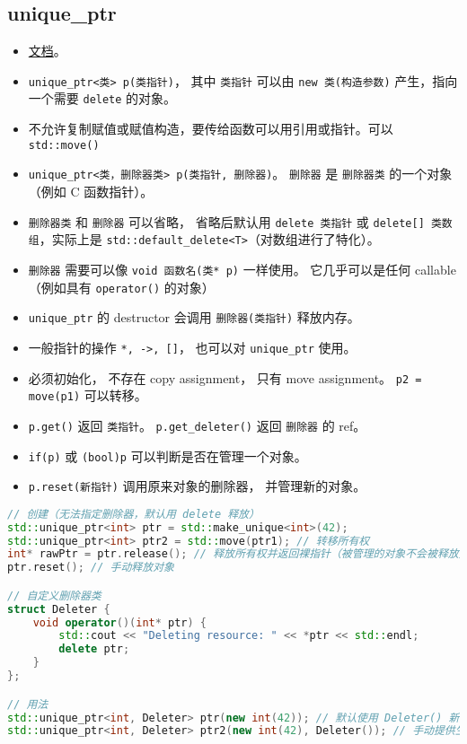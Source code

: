 
\begin{issues}
\issueDraft
\end{issues}

\subsection{unique\_ptr}
\begin{itemize}
\item \href{https://en.cppreference.com/w/cpp/memory/unique_ptr}{文档}。
\item \verb`unique_ptr<类> p(类指针)`， 其中 \verb`类指针` 可以由 \verb`new 类(构造参数)` 产生，指向一个需要 \verb`delete` 的对象。
\item 不允许复制赋值或赋值构造，要传给函数可以用引用或指针。可以 \verb`std::move()`
\item \verb`unique_ptr<类，删除器类> p(类指针, 删除器)`。 \verb`删除器` 是 \verb`删除器类` 的一个对象（例如 C 函数指针）。
\item \verb`删除器类` 和 \verb`删除器` 可以省略， 省略后默认用 \verb`delete 类指针` 或 \verb`delete[] 类数组`，实际上是 \verb`std::default_delete<T>`（对数组进行了特化）。
\item \verb`删除器` 需要可以像 \verb`void 函数名(类* p)` 一样使用。 它几乎可以是任何 callable（例如具有 \verb`operator()` 的对象）
\item \verb`unique_ptr` 的 destructor 会调用 \verb`删除器(类指针)` 释放内存。
\item 一般指针的操作 \verb`*, ->, []`， 也可以对 \verb`unique_ptr` 使用。
\item 必须初始化， 不存在 copy assignment， 只有 move assignment。 \verb`p2 = move(p1)` 可以转移。
\item \verb`p.get()` 返回 \verb`类指针`。 \verb`p.get_deleter()` 返回 \verb`删除器` 的 ref。
\item \verb`if(p)` 或 \verb`(bool)p` 可以判断是否在管理一个对象。
\item \verb`p.reset(新指针)` 调用原来对象的删除器， 并管理新的对象。
\end{itemize}
\begin{lstlisting}[language=cpp]
// 创建（无法指定删除器，默认用 delete 释放）
std::unique_ptr<int> ptr = std::make_unique<int>(42);
std::unique_ptr<int> ptr2 = std::move(ptr1); // 转移所有权
int* rawPtr = ptr.release(); // 释放所有权并返回裸指针（被管理的对象不会被释放）
ptr.reset(); // 手动释放对象

// 自定义删除器类
struct Deleter {
    void operator()(int* ptr) {
        std::cout << "Deleting resource: " << *ptr << std::endl;
        delete ptr;
    }
};

// 用法
std::unique_ptr<int, Deleter> ptr(new int(42)); // 默认使用 Deleter() 新建生成器
std::unique_ptr<int, Deleter> ptr2(new int(42), Deleter()); // 手动提供生成器
\end{lstlisting}


